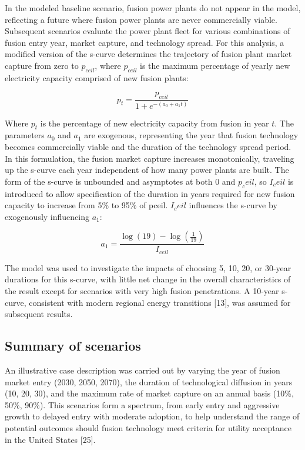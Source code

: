 \documentclass[preprint, 12pt]{elsarticle}
\begin{document}
In the modeled baseline scenario, fusion power plants do not appear in the model, reflecting a future where fusion power plants are never commercially viable. Subsequent scenarios evaluate the power plant fleet for various combinations of fusion entry year, market capture, and technology spread. For this analysis, a modified version of the s-curve determines the trajectory of fusion plant market capture from zero to $p_{ceil}$, where $p_{ceil}$ is the maximum percentage of yearly new electricity capacity comprised of new fusion plants: 

$$p_t = \frac{p_{ceil}}{1+e^{-(a_0+a_1t)}}$$

Where $p_t$ is the percentage of new electricity capacity from fusion in year $t$. The parameters $a_0$ and $a_1$ are exogenous, representing the year that fusion technology becomes commercially viable and the duration of the technology spread period. In this formulation, the fusion market capture increases monotonically, traveling up the s-curve each year independent of how many power plants are built. The form of the s-curve is unbounded and asymptotes at both 0 and $p_ceil$, so $I_ceil$ is introduced to allow specification of the duration in years required for new fusion capacity to increase from 5\% to 95\% of pceil. $I_ceil$ influences the s-curve by exogenously influencing $a_1$:

$$a_1 = \frac{\log(19)-\log(\frac{1}{19})}{I_{ceil}}$$

The model was used to investigate the impacts of choosing 5, 10, 20, or 30-year durations for this s-curve, with little net change in the overall characteristics of the result except for scenarios with very high fusion penetrations. A 10-year s-curve, consistent with modern regional energy transitions [13], was assumed for subsequent results.

\subsection{Summary of scenarios}

An illustrative case description was carried out by varying the year of fusion market entry (2030, 2050, 2070), the duration of technological diffusion in years (10, 20, 30), and the maximum rate of market capture on an annual basis (10\%, 50\%, 90\%). This scenarios form a spectrum, from early entry and aggressive growth to delayed entry with moderate adoption, to help understand the range of potential outcomes should fusion technology meet criteria for utility acceptance in the United States [25].
\end{document}
